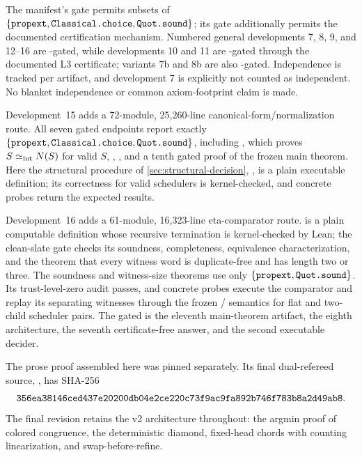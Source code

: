 The manifest's  gate permits subsets of
\(\{\texttt{propext},\texttt{Classical.choice},\texttt{Quot.sound}\}\); its
 gate additionally permits the documented 
certification mechanism.  Numbered general developments 7, 8, 9, and 12--16
are -gated, while developments 10 and 11 are -gated
through the documented L3 certificate; variants 7b and 8b are also
-gated.  Independence is tracked per artifact, and development 7 is
explicitly not counted as independent.  No blanket independence or common
axiom-footprint claim is made.

Development~15 adds a 72-module, 25,260-line canonical-form/normalization
route.  All seven gated endpoints report exactly
\(\{\texttt{propext},\texttt{Classical.choice},\texttt{Quot.sound}\}\), including
, which proves \(S\mathrel{\simeq_{\mathrm{int}}} N(S)\) for valid
\(S\), , ,
and a tenth gated proof of the frozen main theorem.  Here the structural
procedure of \autoref{sec:structural-decision}, , is a
plain executable
 definition; its correctness for valid schedulers is
kernel-checked, and concrete  probes return the expected results.

Development~16 adds a 61-module, 16,323-line eta-comparator route.
 is a plain computable definition whose recursive termination
is kernel-checked by Lean; the clean-slate gate checks its soundness,
completeness, equivalence characterization, and the theorem that every witness
word is duplicate-free and has length two or three.  The soundness and
witness-size theorems use only \(\{\texttt{propext},\texttt{Quot.sound}\}\).
Its trust-level-zero audit passes, and concrete  probes execute the
comparator and replay its separating witnesses through the frozen
/ semantics for flat and two-child scheduler pairs.
The gated  is the eleventh main-theorem artifact, the eighth
architecture, the seventh certificate-free answer, and the second executable
decider.

The prose proof assembled here was pinned separately.  Its final dual-refereed
source, , has SHA-256
\[
\texttt{356ea38146ced437e20200db04e2ce220c73f9ac9fa892b746f783b8a2d49ab8}.
\]
The final revision retains the v2 architecture throughout: the argmin proof of
colored congruence, the deterministic diamond, fixed-head chords with counting
linearization, and swap-before-refine.

